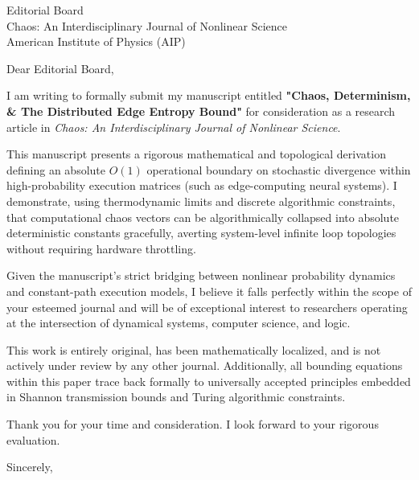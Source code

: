 \documentclass[11pt,a4paper]{letter}
\begin{document}
\begin{letter}{Editorial Board \\ Chaos: An Interdisciplinary Journal of Nonlinear Science \\ American Institute of Physics (AIP)}

\opening{Dear Editorial Board,}

I am writing to formally submit my manuscript entitled \textbf{"Chaos, Determinism, \& The Distributed Edge Entropy Bound"} for consideration as a research article in \textit{Chaos: An Interdisciplinary Journal of Nonlinear Science}.

This manuscript presents a rigorous mathematical and topological derivation defining an absolute \(O(1)\) operational boundary on stochastic divergence within high-probability execution matrices (such as edge-computing neural systems). I demonstrate, using thermodynamic limits and discrete algorithmic constraints, that computational chaos vectors can be algorithmically collapsed into absolute deterministic constants gracefully, averting system-level infinite loop topologies without requiring hardware throttling.

Given the manuscript's strict bridging between nonlinear probability dynamics and constant-path execution models, I believe it falls perfectly within the scope of your esteemed journal and will be of exceptional interest to researchers operating at the intersection of dynamical systems, computer science, and logic.

This work is entirely original, has been mathematically localized, and is not actively under review by any other journal. Additionally, all bounding equations within this paper trace back formally to universally accepted principles embedded in Shannon transmission bounds and Turing algorithmic constraints. 

Thank you for your time and consideration. I look forward to your rigorous evaluation.

\closing{Sincerely,}

\end{letter}
\end{document}
